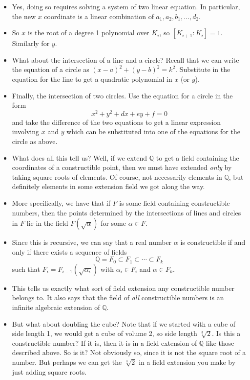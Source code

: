 \documentclass[12pt]{article}
\theoremstyle{plain}
\theoremstyle{definition}
\theoremstyle{remark}
\def\Q{\mathbb Q}
\begin{document}
\begin{itemize}
\item Yes, doing so requires solving a system of two linear equation.  In particular, the new $x$ coordinate is a linear combination of $a_1, a_2, b_1, \ldots, d_2$.  
\item So $x$ is the root of a degree 1 polynomial over $K_i$, so $[K_{i+1}:K_i] = 1$.  Similarly for $y$.
\item What about the intersection of a line and a circle?  Recall that we can write the equation of a circle as $(x-a)^2 + (y- b)^2 = k^2$.  Substitute in the equation for the line to get a quadratic polynomial in $x$ (or $y$).  
\item Finally, the intersection of two circles.  Use the equation for a circle in the form
\[x^2 + y^2 +dx + ey + f = 0\]
and take the difference of the two equations to get a linear expression involving $x$ and $y$ which can be substituted into one of the equations for the circle as above.
\item What does all this tell us?  Well, if we extend $\Q$ to get a field containing the coordinates of a constructible point, then we must have extended \emph{only} by taking square roots of elements.  Of course, not necessarily elements in $\Q$, but definitely elements in some extension field we got along the way.
\item More specifically, we have that if $F$ is some field containing constructible numbers, then the points determined by the intersections of lines and circles in $F$ lie in the field $F(\sqrt{\alpha})$ for some $\alpha \in F$.
\item Since this is recursive, we can say that a real number $\alpha$ is constructible if and only if there exists a sequence of fields 
\[{\mathbb Q} = F_0 \subset F_1 \subset \cdots \subset F_k\]
such that $F_i = F_{i-1}(\sqrt{\alpha_i})$ with $\alpha_i \in F_i$ and $\alpha \in F_k$.

\item This tells us exactly what sort of field extension any constructible number belongs to.  It also says that the field of \emph{all} constructible numbers is an infinite algebraic extension of $\Q$.

\item But what about doubling the cube?  Note that if we started with a cube of side length 1, we would get a cube of volume 2, so side length $\sqrt[3]{2}$.  Is this a constructible number?  If it is, then it is in a field extension of $\Q$ like those described above.  So is it?  Not obviously so, since it is not the square root of a number.  But perhaps we can get the $\sqrt[3]{2}$ in a field extension you make by just adding square roots.


\end{itemize}
\end{document}
